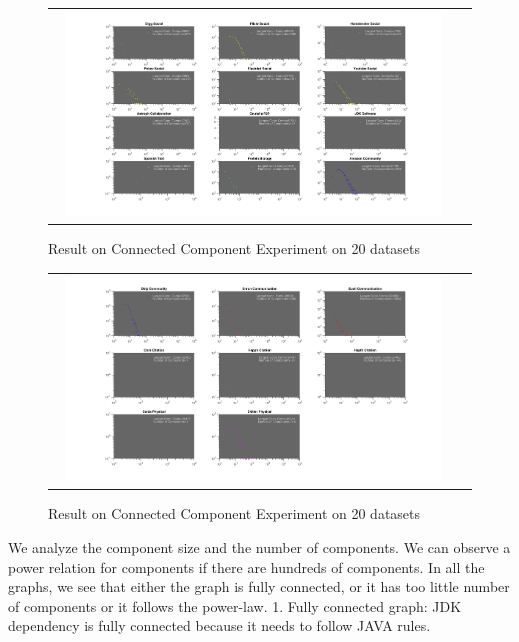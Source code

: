 \begin{figure}[H]
\begin{center}
\begin{tabular}{cc}
     \includegraphics[width=0.95\textwidth]{FIG/cc12.png}
\end{tabular}
\caption{Result on Connected Component Experiment on 20 datasets}
\end{center}
\end{figure}

\begin{figure}[H]
\begin{center}
\begin{tabular}{cc}
     \includegraphics[width=0.95\textwidth]{FIG/cc22.png}
\end{tabular}
\caption{Result on Connected Component Experiment on 20 datasets}
\end{center}
\end{figure}

We analyze the component size and the number of components. We can observe a power relation for components if there are hundreds of components. In all the graphs, we see that either the graph is fully connected, or it has too little number of components or it follows the power-law.
1. Fully connected graph: 
JDK dependency is fully connected because it needs to follow JAVA rules.

